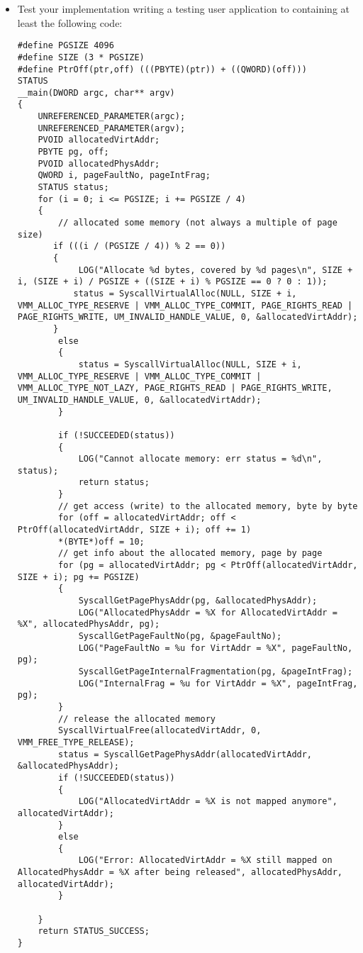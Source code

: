 \begin{itemize}
        \item Test your implementation writing a testing user application to containing at least the following code:
\begin{lstlisting}
#define PGSIZE 4096
#define SIZE (3 * PGSIZE)
#define PtrOff(ptr,off) (((PBYTE)(ptr)) + ((QWORD)(off)))
STATUS
__main(DWORD argc, char** argv)
{
    UNREFERENCED_PARAMETER(argc);
    UNREFERENCED_PARAMETER(argv);
    PVOID allocatedVirtAddr;
    PBYTE pg, off;
    PVOID allocatedPhysAddr;
    QWORD i, pageFaultNo, pageIntFrag;
    STATUS status;
    for (i = 0; i <= PGSIZE; i += PGSIZE / 4)
    {
        // allocated some memory (not always a multiple of page size)
       if (((i / (PGSIZE / 4)) % 2 == 0))
       {
            LOG("Allocate %d bytes, covered by %d pages\n", SIZE + i, (SIZE + i) / PGSIZE + ((SIZE + i) % PGSIZE == 0 ? 0 : 1));
           status = SyscallVirtualAlloc(NULL, SIZE + i, VMM_ALLOC_TYPE_RESERVE | VMM_ALLOC_TYPE_COMMIT, PAGE_RIGHTS_READ | PAGE_RIGHTS_WRITE, UM_INVALID_HANDLE_VALUE, 0, &allocatedVirtAddr);
       }
        else
        {
            status = SyscallVirtualAlloc(NULL, SIZE + i, VMM_ALLOC_TYPE_RESERVE | VMM_ALLOC_TYPE_COMMIT | VMM_ALLOC_TYPE_NOT_LAZY, PAGE_RIGHTS_READ | PAGE_RIGHTS_WRITE, UM_INVALID_HANDLE_VALUE, 0, &allocatedVirtAddr);
        }

        if (!SUCCEEDED(status))
        {
            LOG("Cannot allocate memory: err status = %d\n", status);
            return status;
        }
        // get access (write) to the allocated memory, byte by byte
        for (off = allocatedVirtAddr; off < PtrOff(allocatedVirtAddr, SIZE + i); off += 1)
        *(BYTE*)off = 10;
        // get info about the allocated memory, page by page
        for (pg = allocatedVirtAddr; pg < PtrOff(allocatedVirtAddr, SIZE + i); pg += PGSIZE)
        {
            SyscallGetPagePhysAddr(pg, &allocatedPhysAddr);
            LOG("AllocatedPhysAddr = %X for AllocatedVirtAddr = %X", allocatedPhysAddr, pg);
            SyscallGetPageFaultNo(pg, &pageFaultNo);
            LOG("PageFaultNo = %u for VirtAddr = %X", pageFaultNo, pg);
            SyscallGetPageInternalFragmentation(pg, &pageIntFrag);
            LOG("InternalFrag = %u for VirtAddr = %X", pageIntFrag, pg);
        }
        // release the allocated memory
        SyscallVirtualFree(allocatedVirtAddr, 0, VMM_FREE_TYPE_RELEASE);
        status = SyscallGetPagePhysAddr(allocatedVirtAddr, &allocatedPhysAddr);
        if (!SUCCEEDED(status))
        {
            LOG("AllocatedVirtAddr = %X is not mapped anymore", allocatedVirtAddr);
        }
        else
        {
            LOG("Error: AllocatedVirtAddr = %X still mapped on AllocatedPhysAddr = %X after being released", allocatedPhysAddr, allocatedVirtAddr);
        }

    }
    return STATUS_SUCCESS;
}
\end{lstlisting}

\end{itemize}



